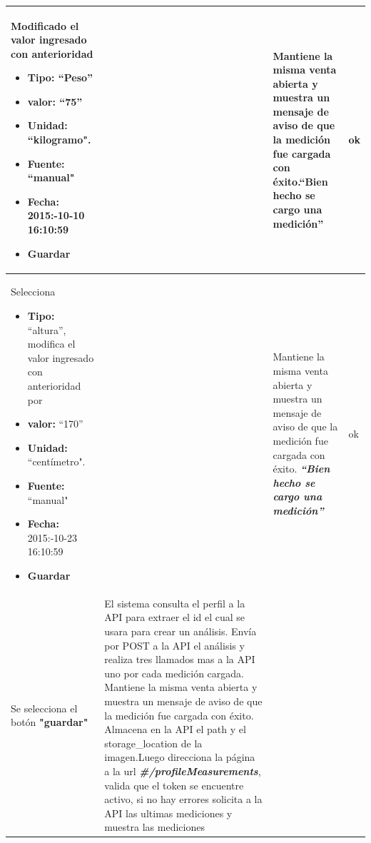 {\begin{longtable}{|p{4cm}|p{4cm}|p{4cm}|p{3cm}|}
  				
  				
  				
  				
  				Modificado el valor ingresado con anterioridad
  				
  				\begin{itemize}
  					\item \textbf{Tipo:} ``Peso''
  					\item \textbf{valor: }``75''
  					\item \textbf{Unidad:} ``kilogramo".
  					\item \textbf{Fuente: }``manual"
  					\item \textbf{Fecha: }2015:-10-10 16:10:59
  					\item \textbf{ Guardar}
  				\end{itemize}
  				&
  				& Mantiene la misma venta abierta y muestra un mensaje de aviso de que la
  				medición fue cargada con éxito.\textbf{``Bien hecho se cargo una medición''}
  				& ok
  				\\ \hline
  				
  				
  				
  				
  				Selecciona
  				
  				
  				
  				\begin{itemize}
  					\item \textbf{Tipo:} ``altura'', modifica el valor ingresado con anterioridad
  					por
  					\item \textbf{valor: }``170''
  					\item \textbf{Unidad:} ``centímetro".
  					\item \textbf{Fuente: }``manual"
  					\item \textbf{Fecha: }2015:-10-23 16:10:59
  					\item \textbf{ Guardar}
  				\end{itemize}
  				&
  				&
  				Mantiene la misma venta abierta y muestra un mensaje de aviso de que
  				la medición fue cargada con éxito.\textit{\textbf{ ``Bien hecho se cargo una medición''}}
  				& ok
  				\\ \hline
  				
  				
  				
  				
  				Se selecciona el botón \textbf{"guardar"}
  				& El sistema consulta el perfil a la API para extraer el id el cual se usara para crear un análisis. Envía por POST a la API el análisis y realiza tres llamados mas a la API uno por cada medición cargada.
  				Mantiene la misma venta abierta y muestra un mensaje de aviso de que
  				la medición fue cargada con éxito. Almacena en la API el path y el storage\_location de la imagen.Luego direcciona la página a la url
  				\textit{\textbf{\#/profileMeasurements}}, valida que el token se encuentre activo, si no hay
  				errores solicita a la API las ultimas mediciones y muestra las mediciones
  				

\end{longtable}}
